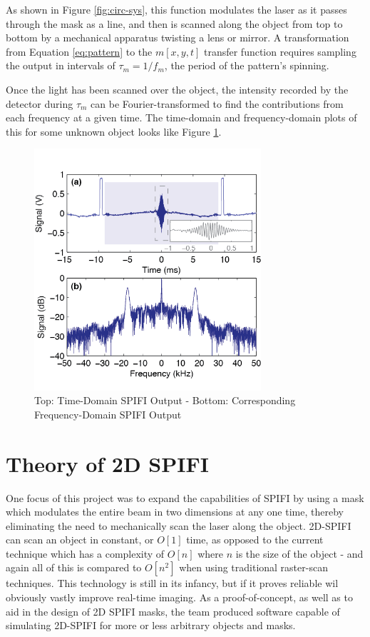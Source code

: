 \documentclass[12pt]{article}
\begin{document}
As shown in Figure \ref{fig:circ-sys}, this function modulates the laser as it passes
through the mask as a line, and then is scanned along the object from top
to bottom by a mechanical apparatus twisting a lens or mirror. A transformation from Equation
\ref{eq:pattern} to the $m[x,y,t]$ transfer function requires sampling the
output in intervals of $\tau_m=1/f_m$, the period of the pattern's 
spinning. 

Once the light has been scanned over the object, the intensity recorded by
the detector during $\tau_m$ can be Fourier-transformed to find the
contributions from each frequency at a given time. The time-domain and frequency-domain plots of this for some
unknown object looks like Figure \ref{fig:fourier}. 

\begin{figure}[H]
\centering
\includegraphics[width=0.75\textwidth]{Fourier_Transform}
\caption{Top: Time-Domain SPIFI Output - Bottom: Corresponding Frequency-Domain SPIFI Output\label{fig:fourier}}
\end{figure}

\section*{Theory of 2D SPIFI}
One focus of this project was to expand the capabilities of SPIFI by using a
mask which modulates the entire beam in two dimensions at any one time,
thereby eliminating the need to mechanically scan the laser along the object. 2D-SPIFI can scan an object in constant, or $O[1]$ time, as opposed to the current technique which has a complexity of $O[n]$ where $n$ is the size of the object - and again all of this is compared to $O[n^2]$ when using traditional raster-scan techniques. This technology is still in its infancy, but if it proves reliable wil obviously vastly improve real-time imaging. As a proof-of-concept, as well as to aid in the design of 2D SPIFI masks, the team produced software capable of simulating 2D-SPIFI for more or less arbitrary objects and masks.
\end{document}
